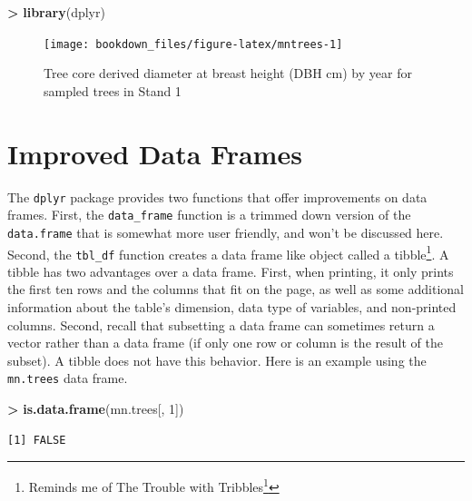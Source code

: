 \documentclass[]{krantz}
\makeatletter
\newenvironment{Shaded}{\begin{snugshade}}{\end{snugshade}}
\newcommand{\DecValTok}[1]{\textcolor[rgb]{0.06,0.06,0.06}{#1}}
\newcommand{\KeywordTok}[1]{\textcolor[rgb]{0.27,0.27,0.27}{\textbf{#1}}}
\newcommand{\NormalTok}[1]{#1}
\newcommand{\OperatorTok}[1]{\textcolor[rgb]{0.43,0.43,0.43}{\textbf{#1}}}
\newcommand{\StringTok}[1]{\textcolor[rgb]{0.5,0.5,0.5}{#1}}
\renewcommand{\href}[2]{#2\footnote{\url{#1}}}
\newenvironment{kframe}{%
\medskip{}
\setlength{\fboxsep}{.8em}
 \def\at@end@of@kframe{}%
 \ifinner\ifhmode%
  \def\at@end@of@kframe{\end{minipage}}%
  \begin{minipage}{\columnwidth}%
 \fi\fi%
 \def\FrameCommand##1{\hskip\@totalleftmargin \hskip-\fboxsep
 \colorbox{shadecolor}{##1}\hskip-\fboxsep
     \hskip-\linewidth \hskip-\@totalleftmargin \hskip\columnwidth}%
 \MakeFramed {\advance\hsize-\width
   \@totalleftmargin\z@ \linewidth\hsize
   \@setminipage}}%
 {\par\unskip\endMakeFramed%
 \at@end@of@kframe}
\renewenvironment{Shaded}{\begin{kframe}}{\end{kframe}}
\makeatother
\begin{document}
\begin{Shaded}
\begin{Highlighting}[]
\OperatorTok{>}\StringTok{ }\KeywordTok{library}\NormalTok{(dplyr)}
\end{Highlighting}
\end{Shaded}

\begin{figure}

{\centering \texttt{[image: bookdown\_files/figure-latex/mntrees-1]} 

}

\caption{Tree core derived diameter at breast height (DBH cm) by year for sampled trees in Stand 1}\label{fig:mntrees}
\end{figure}

\hypertarget{improved-data-frames}{%
\section{Improved Data Frames}\label{improved-data-frames}}

The \texttt{dplyr} package provides two functions that offer improvements on data frames. First, the \texttt{data\_frame} function is a trimmed down version of the \texttt{data.frame} that is somewhat more user friendly, and won't be discussed here. Second, the \texttt{tbl\_df} function creates a data frame like object called a tibble\footnote{Reminds me of \href{https://en.wikipedia.org/wiki/The_Trouble_with_Tribbles}{The Trouble with Tribbles}}. A tibble has two advantages over a data frame. First, when printing, it only prints the first ten rows and the columns that fit on the page, as well as some additional information about the table's dimension, data type of variables, and non-printed columns. Second, recall that subsetting a data frame can sometimes return a vector rather than a data frame (if only one row or column is the result of the subset). A tibble does not have this behavior. Here is an example using the \texttt{mn.trees} data frame.

\begin{Shaded}
\begin{Highlighting}[]
\OperatorTok{>}\StringTok{ }\KeywordTok{is.data.frame}\NormalTok{(mn.trees[, }\DecValTok{1}\NormalTok{])}
\end{Highlighting}
\end{Shaded}

\begin{verbatim}
[1] FALSE
\end{verbatim}
\end{document}
